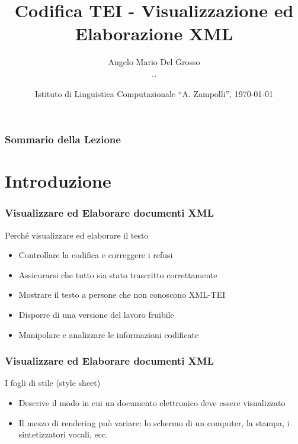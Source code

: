 \documentclass{beamer}
\title{Codifica TEI - Visualizzazione ed Elaborazione XML}
\author[A.M. Del Grosso]{Angelo Mario Del Grosso \\ \tiny\textit{..}}
\institute{\texttt{angelo.delgrosso@ilc.cnr.it} \\\textit{CNR-ILC-LicoLab} \\\url{http://licolab.ilc.cnr.it/}}
\date{Istituto di Linguistica Computazionale ``A. Zampolli'', \today}
\begin{document}
    
    \begin{frame}
        \maketitle
    \end{frame}
    
    \begin{frame}
        \frametitle{Sommario della Lezione}
        \tableofcontents
    \end{frame}
    
    \section{Introduzione}
    
    \begin{frame}
        \frametitle{Visualizzare ed Elaborare documenti XML}
        \addtocounter{nframe}{1}
        

         \begin{block}{Perché visualizzare ed elaborare il testo}
             \begin{itemize}
                \item Controllare la codifica e correggere i refusi
                \item Assicurarsi che tutto sia stato trascritto correttamente
                \item Mostrare il testo a persone che non conoscono XML-TEI
                \item Disporre di una versione del lavoro fruibile
                \item Manipolare e analizzare le informazioni codificate
            \end{itemize}
         \end{block}
        
    \end{frame}
    
    \begin{frame}
        \frametitle{Visualizzare ed Elaborare documenti XML}
        \addtocounter{nframe}{1}
        
        \begin{block}{I fogli di stile (style sheet)}
           \begin{itemize}
               \item Descrive il modo in cui un documento elettronico deve essere visualizzato
               \item Il mezzo di rendering può variare: lo schermo di un computer, la stampa, i sintetizzatori vocali, ecc.
           \end{itemize}
        \end{block}
        
    \end{frame}
\end{document}
